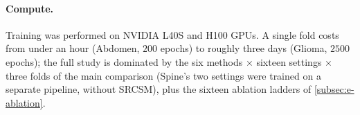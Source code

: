 \paragraph{Compute.} Training was performed on NVIDIA L40S and H100 GPUs. A
single fold costs from under an hour (Abdomen, $200$ epochs) to roughly three
days (Glioma, $2500$ epochs); the full study is dominated by the six
methods $\times$ sixteen settings $\times$ three folds of the main comparison
(Spine's two settings were trained on a separate pipeline, without SRCSM),
plus the sixteen ablation ladders of \cref{subsec:e-ablation}.
